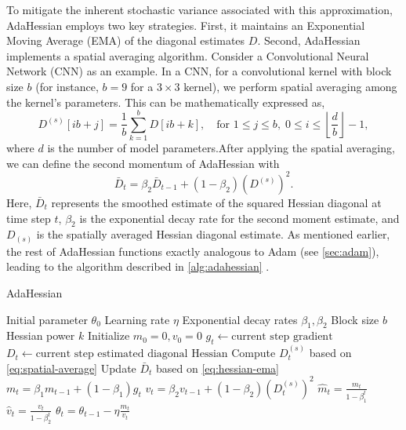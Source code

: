 To mitigate the inherent stochastic variance associated with this approximation, AdaHessian employs two key strategies.
First, it maintains an Exponential Moving Average (EMA) of the diagonal estimates $D$.
Second, AdaHessian implements a spatial averaging algorithm. Consider a Convolutional Neural Network (CNN) as an example. In a CNN, for a convolutional kernel with block size $b$ (for instance, $b = 9$ for a $3 \times 3$ kernel), we perform spatial averaging among the kernel's parameters.
This can be mathematically expressed as,
\begin{equation}
    \label{eq:spatial-average}
    D^{(s)}[ib+j] = \frac{1}{b} \sum_{k=1}^b D[ib + k], \quad \text{for } 1 \leq j \leq b, \; 0 \leq i \leq \left\lfloor\frac{d}{b}\right\rfloor - 1,
\end{equation}\cite{yao2021adahessian}
where $d$ is the number of model parameters.After applying the spatial averaging, we can define the second momentum of AdaHessian with
\begin{equation}
    \label{eq:hessian-ema}
    \bar{D}_t = \beta_2 \bar{D}_{t-1} + (1 - \beta_2) (D^{(s)})^2.
\end{equation}
Here, $\bar{D}_t$ represents the smoothed estimate of the squared Hessian diagonal at time step $t$, $\beta_2$ is the exponential decay rate for the second moment estimate, and $D_{(s)}$ is the spatially averaged Hessian diagonal estimate.
As mentioned earlier, the rest of AdaHessian functions exactly analogous to Adam (see \ref{sec:adam}), leading to the
algorithm described in \ref{alg:adahessian} \cite{yao2021adahessian}.
\begin{algorithm}
    \caption{AdaHessian}
    \label{alg:adahessian}

    \begin{algorithmic}[1]
    \Require Initial parameter $\theta_0$
    \Require Learning rate $\eta$
    \Require Exponential decay rates $\beta_1, \beta_2$
    \Require Block size $b$
    \Require Hessian power $k$
    \State Initialize $m_0 = 0, v_0 = 0$
        \State $g_t \gets \text{current step gradient}$
        \State $D_t \gets \text{current step estimated diagonal Hessian}$
        \State Compute $D_t^{(s)}$ based on \ref{eq:spatial-average}
        \State Update $\bar{D}_t$ based on \ref{eq:hessian-ema}
        \State $m_t = \beta_1 m_{t-1} + (1 - \beta_1) g_t$
        \State $v_t = \beta_2 v_{t-1} + (1 - \beta_2) (D_t^{(s)})^2$
        \State $\hat{m}_t = \frac{m_t}{1-\beta_1^t}$
        \State $\hat{v}_t = \frac{v_t}{1-\beta_2^t}$
        \State $\theta_t = \theta_{t-1} - \eta \frac{m_t}{v_t}$
    \EndFor
    \end{algorithmic}
    \end{algorithm}
    
